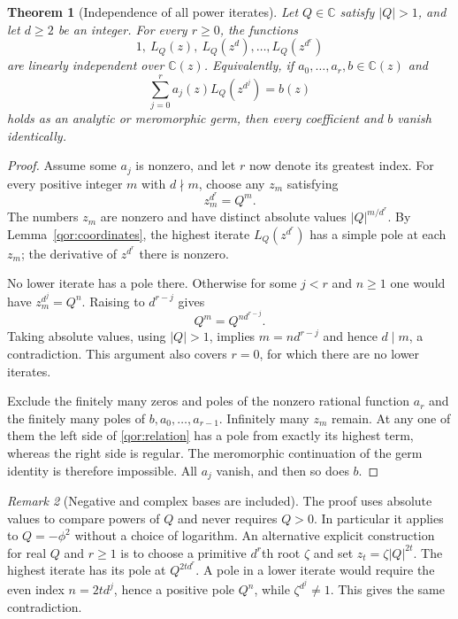 \documentclass[11pt,a4paper]{article}
\newtheorem{theorem}{Theorem}[section]
\theoremstyle{definition}\newtheorem{definition}[theorem]{Definition}
\theoremstyle{remark}\newtheorem{remark}[theorem]{Remark}
\begin{document}
\begin{theorem}[Independence of all power iterates]
\label{qor:no-mahler}
Let $Q\in\mathbb C$ satisfy $|Q|>1$, and let $d\geq2$ be an integer.
For every $r\geq0$, the functions
\[
 1,\ L_Q(z),\ L_Q(z^d),\ldots,L_Q(z^{d^r})
\]
are linearly independent over $\mathbb C(z)$.  Equivalently, if
$a_0,\ldots,a_r,b\in\mathbb C(z)$ and
\begin{equation}\label{qor:relation}
 \sum_{j=0}^r a_j(z)L_Q(z^{d^j})=b(z)
\end{equation}
holds as an analytic or meromorphic germ, then every coefficient
and $b$ vanish identically.
\end{theorem}
\begin{proof}
Assume some $a_j$ is nonzero, and let $r$ now denote its greatest
index.  For every positive integer $m$ with $d\nmid m$, choose any
$z_m$ satisfying
\[
 z_m^{d^r}=Q^m.
\]
The numbers $z_m$ are nonzero and have distinct absolute values
$|Q|^{m/d^r}$.  By Lemma~\ref{qor:coordinates}, the highest iterate
$L_Q(z^{d^r})$ has a simple pole at each $z_m$; the derivative of
$z^{d^r}$ there is nonzero.

No lower iterate has a pole there.  Otherwise for some $j<r$
and $n\geq1$ one would have $z_m^{d^j}=Q^n$.  Raising to
$d^{r-j}$ gives
\[
 Q^m=Q^{nd^{r-j}}.
\]
Taking absolute values, using $|Q|>1$, implies
$m=nd^{r-j}$ and hence $d\mid m$, a contradiction.
This argument also covers $r=0$, for which there are no lower
iterates.

Exclude the finitely many zeros and poles of the nonzero rational
function $a_r$ and the finitely many poles of $b,a_0,\ldots,a_{r-1}$.
Infinitely many $z_m$ remain.  At any one of them the left side of
\eqref{qor:relation} has a pole from exactly its highest term,
whereas the right side is regular.  The meromorphic continuation
of the germ identity is therefore impossible.  All $a_j$ vanish,
and then so does $b$.
\end{proof}

\begin{remark}[Negative and complex bases are included]
The proof uses absolute values to compare powers of $Q$ and never
requires $Q>0$.  In particular it applies to $Q=-\phi^2$ without
a choice of logarithm.  An alternative explicit construction for
real $Q$ and $r\geq1$ is to choose a primitive $d^r$th root
$\zeta$ and set $z_t=\zeta|Q|^{2t}$.  The highest iterate has its
pole at $Q^{2td^r}$.  A pole in a lower iterate would require the
even index $n=2td^j$, hence a positive pole $Q^n$, while
$\zeta^{d^j}\ne1$.  This gives the same contradiction.
\end{remark}
\end{document}
